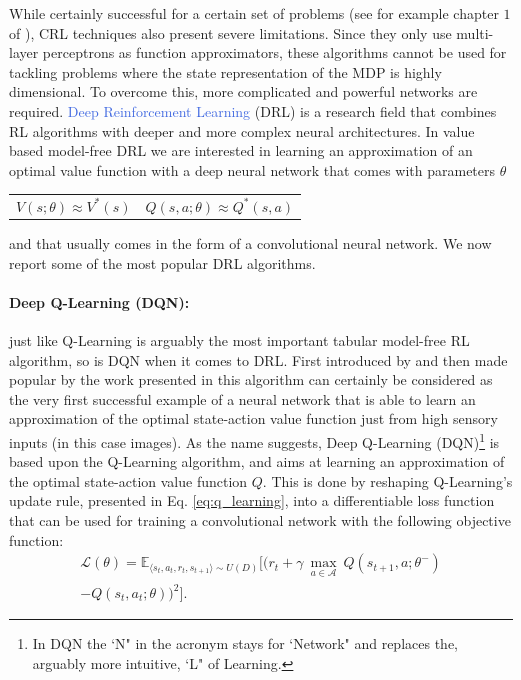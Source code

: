 While certainly successful for a certain set of problems (see for example chapter $1$ of \cite{sabatelli2017learning}), CRL techniques also present severe limitations. Since they only use multi-layer perceptrons as function approximators, these algorithms cannot be used for tackling problems where the state representation of the MDP is highly dimensional. To overcome this, more complicated and powerful networks are required. \textcolor{RoyalBlue}{Deep Reinforcement Learning} (DRL) \cite{arulkumaran2017deep, li2017deep, franccois2018introduction} is a research field that combines RL algorithms with deeper and more complex neural architectures. In value based model-free DRL we are interested in learning an approximation of an optimal value function with a deep neural network that comes with parameters $\theta$

\noindent
\begin{tabularx}{\linewidth}{@{}XX@{}}
\begin{equation}
	  V(s;\theta)\approx V^{*}(s)
	  \label{eq:v_approx}
  \end{equation}
&
\begin{equation}  
	Q(s,a;\theta)\approx Q^{*}(s,a)
	\label{eq:q_approx}
  \end{equation}
\end{tabularx}
and that usually comes in the form of a convolutional neural network. We now report some of the most popular DRL algorithms. 


\paragraph{Deep Q-Learning (DQN):} just like Q-Learning is arguably the most important tabular model-free RL algorithm, so is DQN when it comes to DRL. First introduced by \citet{mnih2013playing} and then made popular by the work presented in \cite{mnih2015human} this algorithm can certainly be considered as the very first successful example of a neural network that is able to learn an approximation of the optimal state-action value function just from high sensory inputs (in this case images). As the name suggests, Deep Q-Learning (DQN)\footnote{In DQN the `N" in the acronym stays for `Network" and replaces the, arguably more intuitive, `L" of Learning.} is based upon the Q-Learning algorithm, and aims at learning an approximation of the optimal state-action value function $Q$. This is done by reshaping Q-Learning's update rule, presented in Eq. \ref{eq:q_learning}, into a differentiable loss function that can be used for training a convolutional network with the following objective function:
\begin{multline}
	\mathcal{L}(\theta) = \mathds{E}_{\langle s_{t},a_{t},r_{t},s_{t+1}\rangle\sim U(D)} \bigg[\big(r_{t} + \gamma \: \underset{a\in \mathcal{A}}{\max}\: Q(s_{t+1}, a; \theta^{-}) \\ - Q(s_{t}, a_{t}; \theta)\big)^{2}\bigg].
\label{eq:dqn}
\end{multline}

